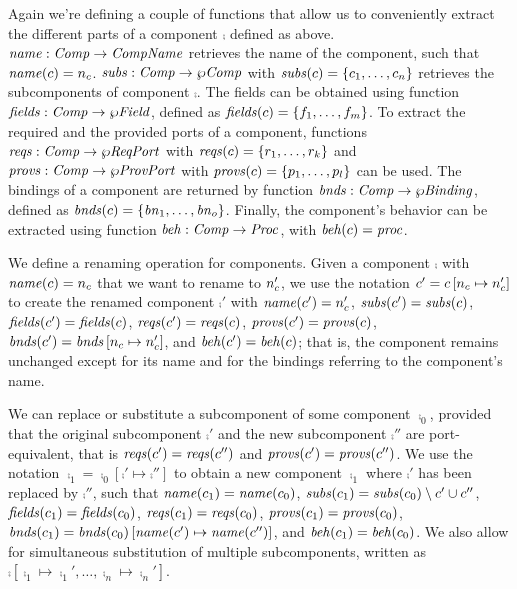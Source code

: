 \documentclass[a4paper,10pt,english]{article}
\begin{document}
Again we're defining a couple of functions that allow us to conveniently extract the different parts of a component $\comp$
defined as above. $\mathit{name} : \mathit{Comp} \rightarrow \mathit{CompName}$ retrieves the name of the component, such that
$\mathit{name}(c) = n_c$. $\mathit{subs} : \mathit{Comp} \rightarrow \wp \mathit{Comp}$ with $\mathit{subs}(c) = \{c_1, \ldots, c_n\}$
retrieves the subcomponents of component $\comp$. The fields can be obtained using function $\mathit{fields} : \mathit{Comp} \rightarrow
\wp \mathit{Field}$, defined as $\mathit{fields}(c) = \{ f_1, \ldots, f_m \}$. To extract the required and the provided ports
of a component, functions $\mathit{reqs} : \mathit{Comp} \rightarrow \wp \mathit{ReqPort}$ with $\mathit{reqs}(c) = \{ r_1, \ldots, r_k \}$
and $\mathit{provs} : \mathit{Comp} \rightarrow \wp \mathit{ProvPort}$ with $\mathit{provs}(c) = \{ p_1, \ldots, p_l \}$ can be used. The
bindings of a component are returned by function $\mathit{bnds} : \mathit{Comp} \rightarrow \wp \mathit{Binding}$, defined as $\mathit{bnds}(c) =
\{ \mathit{bn}_1, \ldots, \mathit{bn}_o \}$. Finally, the component's behavior can be extracted using function $\mathit{beh} : \mathit{Comp}
\rightarrow \mathit{Proc}$, with $\mathit{beh}(c) = \mathit{proc}$.

We define a renaming operation for components. Given a component $\comp$ with $\mathit{name}(c) = n_c$ that we want to
rename to $n_c'$, we use the notation $c' = c\left[n_c\mapsto n_c'\right]$ to create the renamed
component $\comp'$ with $\mathit{name}(c') = n_c'$, $\mathit{subs}(c') = \mathit{subs}(c)$, $\mathit{fields}(c')=\mathit{fields}(c)$,
$\mathit{reqs}(c') = \mathit{reqs}(c)$, $\mathit{provs}(c') = \mathit{provs}(c)$, $\mathit{bnds}(c') =
\mathit{bnds}\left[n_c\mapsto n_c'\right]$, and $\mathit{beh}(c') = \mathit{beh}(c)$; that is, the component remains unchanged
except for its name and for the bindings referring to the component's name.

We can replace or substitute a subcomponent of some component $\comp_0$, provided that the original subcomponent $\comp'$ and the
new subcomponent $\comp''$ are port-equivalent, that is $\mathit{reqs}(c') = \mathit{reqs}(c'')$ and $\mathit{provs}(c') = \mathit{provs}(c'')$.
We use the notation $\comp_1 = \comp_0\left[\comp' \mapsto \comp''\right]$ to obtain a new component $\comp_1$ where $\comp'$ has
been replaced by $\comp''$, such that $\mathit{name}(c_1) = \mathit{name}(c_0)$, $\mathit{subs}(c_1) = \mathit{subs}(c_0) \setminus
c' \cup c''$, $\mathit{fields}(c_1)=\mathit{fields}(c_0)$, $\mathit{reqs}(c_1) = \mathit{reqs}(c_0)$, $\mathit{provs}(c_1) = \mathit{provs}(c_0)$,
$\mathit{bnds}(c_1) = \mathit{bnds}(c_0)\left[\mathit{name}(c')\mapsto\mathit{name}(c'')\right]$, and $\mathit{beh}(c_1) =
\mathit{beh}(c_0)$. We also allow for simultaneous substitution of multiple subcomponents, written as
$\comp\left[\comp_1\mapsto\comp_1', \ldots, \comp_n\mapsto\comp_n'\right]$.
\end{document}
